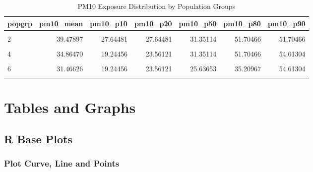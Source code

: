 \documentclass[
]{book}
\begin{document}
\begin{table}[!h]

\caption{\label{tab:unnamed-chunk-242}PM10 Exposure Distribution by Population Groups}
\centering
\begin{tabular}[t]{l|r|r|r|r|r|r}
\hline
popgrp & pm10\_mean & pm10\_p10 & pm10\_p20 & pm10\_p50 & pm10\_p80 & pm10\_p90\\
\hline
\cellcolor{gray!6}{1} & \cellcolor{gray!6}{31.07894} & \cellcolor{gray!6}{24.62676} & \cellcolor{gray!6}{24.62676} & \cellcolor{gray!6}{27.64481} & \cellcolor{gray!6}{30.71275} & \cellcolor{gray!6}{51.70466}\\
\hline
2 & 39.47897 & 27.64481 & 27.64481 & 31.35114 & 51.70466 & 51.70466\\
\hline
\cellcolor{gray!6}{3} & \cellcolor{gray!6}{37.92901} & \cellcolor{gray!6}{23.56121} & \cellcolor{gray!6}{30.71275} & \cellcolor{gray!6}{31.35114} & \cellcolor{gray!6}{51.70466} & \cellcolor{gray!6}{54.61304}\\
\hline
4 & 34.86470 & 19.24456 & 23.56121 & 31.35114 & 51.70466 & 54.61304\\
\hline
\cellcolor{gray!6}{5} & \cellcolor{gray!6}{32.56731} & \cellcolor{gray!6}{19.24456} & \cellcolor{gray!6}{23.56121} & \cellcolor{gray!6}{30.71275} & \cellcolor{gray!6}{35.20967} & \cellcolor{gray!6}{54.61304}\\
\hline
6 & 31.46626 & 19.24456 & 23.56121 & 25.63653 & 35.20967 & 54.61304\\
\hline
\cellcolor{gray!6}{7} & \cellcolor{gray!6}{33.50541} & \cellcolor{gray!6}{19.24456} & \cellcolor{gray!6}{23.56121} & \cellcolor{gray!6}{33.98553} & \cellcolor{gray!6}{45.99021} & \cellcolor{gray!6}{45.99021}\\
\hline
\end{tabular}
\end{table}

\hypertarget{tables-and-graphs}{%
\chapter{Tables and Graphs}\label{tables-and-graphs}}

\hypertarget{r-base-plots}{%
\section{R Base Plots}\label{r-base-plots}}

\hypertarget{plot-curve-line-and-points}{%
\subsection{Plot Curve, Line and Points}\label{plot-curve-line-and-points}}
\end{document}
